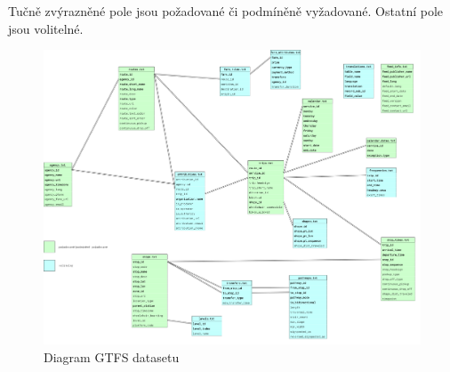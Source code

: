 Tučně zvýrazněné pole jsou požadované či podmíněně vyžadované. Ostatní pole jsou 
volitelné. 
\begin{figure}[H] \centering
    \includegraphics[width=400pt]{./pictures/GTFS-diagram.PNG}
    \caption[Diagram GTFS datasetu]{Diagram GTFS datasetu}
	\label{fig:GTFS-diagram}              
\end{figure}

